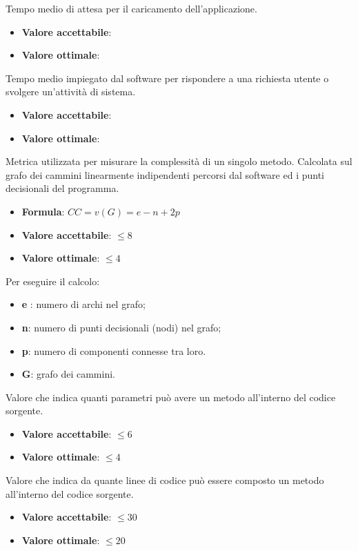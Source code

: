Tempo medio di attesa per il caricamento dell'applicazione.
\begin{itemize}
    \item \textbf{Valore accettabile}:
    \item \textbf{Valore ottimale}:
\end{itemize} 

Tempo medio impiegato dal software per rispondere a una richiesta utente o svolgere un’attività di sistema. 
\begin{itemize}
    \item \textbf{Valore accettabile}:
    \item \textbf{Valore ottimale}:
\end{itemize}  

Metrica utilizzata per misurare la complessità di un singolo metodo. Calcolata sul grafo dei cammini linearmente indipendenti percorsi dal software ed i punti decisionali del programma.
\begin{itemize}
    \item \textbf{Formula}: $CC=v(G)=e-n+2p$
    \item \textbf{Valore accettabile}: $\leq8$
    \item \textbf{Valore ottimale}: $\leq4$
\end{itemize}  
Per eseguire il calcolo:
\begin{itemize}
    \item \textbf{e} : numero di archi nel grafo;
    \item \textbf{n}: numero di punti decisionali (nodi) nel grafo;
    \item \textbf{p}: numero di componenti connesse tra loro.
    \item \textbf{G}: grafo dei cammini.
\end{itemize}

Valore che indica quanti parametri può avere un metodo all'interno del codice sorgente.
\begin{itemize}
    \item \textbf{Valore accettabile}: $\leq6$
    \item \textbf{Valore ottimale}: $\leq4$
\end{itemize} 

Valore che indica da quante linee di codice può essere composto un metodo all'interno del codice sorgente.
\begin{itemize}
    \item \textbf{Valore accettabile}: $\leq30$
    \item \textbf{Valore ottimale}: $\leq20$
\end{itemize} 

